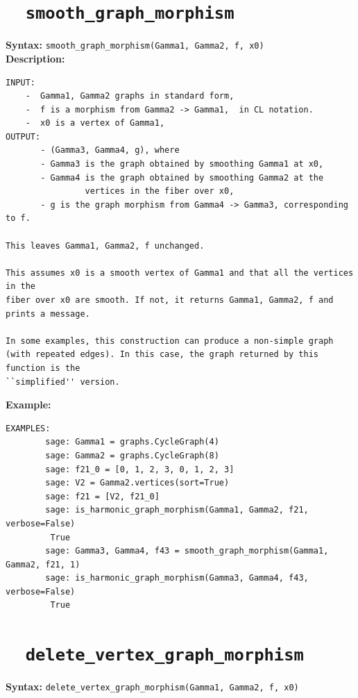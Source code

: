 \documentclass{article}
\begin{document}
\section{\tt \ \ smooth\_graph\_morphism}

\textbf{Syntax:} \verb}smooth_graph_morphism(Gamma1, Gamma2, f, x0)}\\

\textbf{Description:}
\begin{verbatim}
INPUT:
    -  Gamma1, Gamma2 graphs in standard form,
    -  f is a morphism from Gamma2 -> Gamma1,  in CL notation.
    -  x0 is a vertex of Gamma1, 
OUTPUT:
       - (Gamma3, Gamma4, g), where
       - Gamma3 is the graph obtained by smoothing Gamma1 at x0, 
       - Gamma4 is the graph obtained by smoothing Gamma2 at the 
                vertices in the fiber over x0, 
       - g is the graph morphism from Gamma4 -> Gamma3, corresponding to f.
    
This leaves Gamma1, Gamma2, f unchanged.

This assumes x0 is a smooth vertex of Gamma1 and that all the vertices in the
fiber over x0 are smooth. If not, it returns Gamma1, Gamma2, f and prints a message.

In some examples, this construction can produce a non-simple graph
(with repeated edges). In this case, the graph returned by this function is the
``simplified'' version.

\end{verbatim}

\textbf{Example:}
\begin{verbatim}
EXAMPLES:
        sage: Gamma1 = graphs.CycleGraph(4)
        sage: Gamma2 = graphs.CycleGraph(8)
        sage: f21_0 = [0, 1, 2, 3, 0, 1, 2, 3]
        sage: V2 = Gamma2.vertices(sort=True)
        sage: f21 = [V2, f21_0]
        sage: is_harmonic_graph_morphism(Gamma1, Gamma2, f21, verbose=False)
         True
        sage: Gamma3, Gamma4, f43 = smooth_graph_morphism(Gamma1, Gamma2, f21, 1)
        sage: is_harmonic_graph_morphism(Gamma3, Gamma4, f43, verbose=False)
         True
\end{verbatim}

\section{\tt \ \ delete\_vertex\_graph\_morphism}

\textbf{Syntax:} \verb}delete_vertex_graph_morphism(Gamma1, Gamma2, f, x0)}\\
\end{document}
